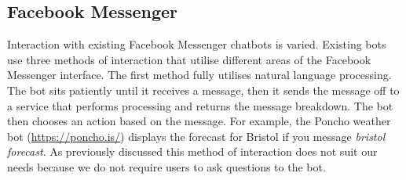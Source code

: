 \subsection*{Facebook Messenger}
Interaction with existing Facebook Messenger chatbots is varied. Existing bots use three methods of interaction that utilise different areas of the Facebook Messenger interface. The first method fully utilises natural language processing. The bot sits patiently until it receives a message, then it sends the message off to a service that performs processing and returns the message breakdown. The bot then chooses an action based on the message. For example, the Poncho weather bot (\url{https://poncho.is/}) displays the forecast for Bristol if you message \textit{bristol forecast}. As previously discussed this method of interaction does not suit our needs because we do not require users to ask questions to the bot.

